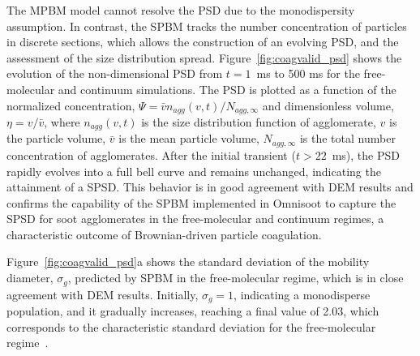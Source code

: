 The MPBM model cannot resolve the PSD due to the monodispersity assumption. In contrast, the SPBM tracks the number concentration of particles in discrete sections, which allows the construction of an evolving PSD, and the assessment of the size distribution spread. Figure~\ref{fig:coagvalid_psd} shows the evolution of the non-dimensional PSD from $t=1$~ms to 500 ms for the free-molecular and continuum simulations. The PSD is plotted as a function of the normalized concentration, ${\Psi= \bar{v}n_{agg}(v,t)/N_{agg,\infty}}$ and dimensionless volume, ${\eta= v/ \bar{v}}$, where ${n_{agg}(v,t)}$ is the size distribution function of agglomerate, ${v}$ is the particle volume, ${\bar{v}}$ is the mean particle volume, ${N_{agg,\infty}}$ is the total number concentration of agglomerates. After the initial transient ($t>22$~ms), the PSD rapidly evolves into a full bell curve and remains unchanged, indicating the attainment of a SPSD. This behavior is in good agreement with DEM results and confirms the capability of the SPBM implemented in Omnisoot to capture the SPSD for soot agglomerates in the free-molecular and continuum regimes, a characteristic outcome of Brownian-driven particle coagulation.


Figure~\ref{fig:coagvalid_psd}a shows the standard deviation of the mobility diameter, ${\sigma_g}$, predicted by SPBM in the free-molecular regime, which is in close agreement with DEM results. Initially, ${\sigma_g}=1$, indicating a monodisperse population, and it gradually increases, reaching a final value of 2.03, which corresponds to the characteristic standard deviation for the free-molecular regime~\citep{vemury1995self}.


